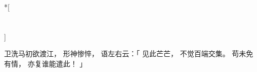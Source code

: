 
\switchcolumn[0]*[\section{}]

卫洗马初欲渡江，
形神惨悴，
语左右云：「
    见此芒芒，
    不觉百端交集。
    苟未免有情，
    亦复谁能遣此！
」

\switchcolumn


